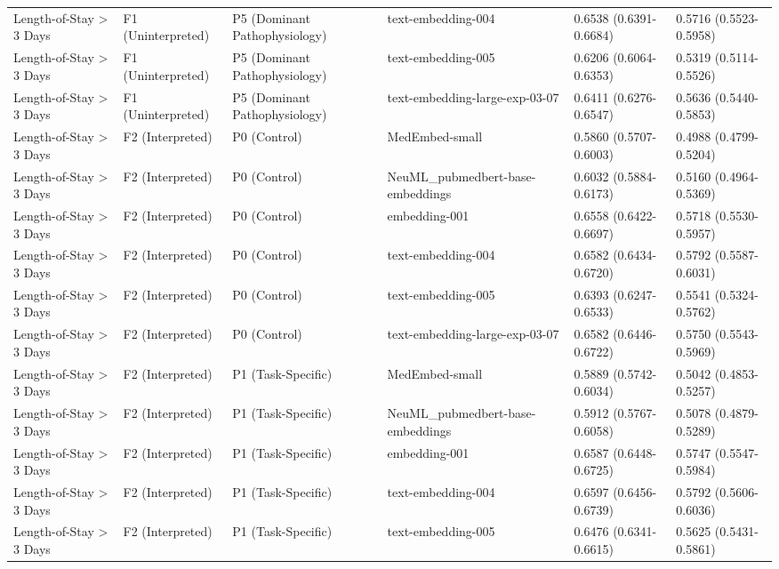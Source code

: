 \begin{tabular}{llllll}
Length-of-Stay \textgreater{} 3 Days & F1 (Uninterpreted) & P5 (Dominant Pathophysiology) & text-embedding-004 & 0.6538 (0.6391-0.6684) & 0.5716 (0.5523-0.5958) \\
Length-of-Stay \textgreater{} 3 Days & F1 (Uninterpreted) & P5 (Dominant Pathophysiology) & text-embedding-005 & 0.6206 (0.6064-0.6353) & 0.5319 (0.5114-0.5526) \\
Length-of-Stay \textgreater{} 3 Days & F1 (Uninterpreted) & P5 (Dominant Pathophysiology) & text-embedding-large-exp-03-07 & 0.6411 (0.6276-0.6547) & 0.5636 (0.5440-0.5853) \\
Length-of-Stay \textgreater{} 3 Days & F2 (Interpreted) & P0 (Control) & MedEmbed-small & 0.5860 (0.5707-0.6003) & 0.4988 (0.4799-0.5204) \\
Length-of-Stay \textgreater{} 3 Days & F2 (Interpreted) & P0 (Control) & NeuML\_pubmedbert-base-embeddings & 0.6032 (0.5884-0.6173) & 0.5160 (0.4964-0.5369) \\
Length-of-Stay \textgreater{} 3 Days & F2 (Interpreted) & P0 (Control) & embedding-001 & 0.6558 (0.6422-0.6697) & 0.5718 (0.5530-0.5957) \\
Length-of-Stay \textgreater{} 3 Days & F2 (Interpreted) & P0 (Control) & text-embedding-004 & 0.6582 (0.6434-0.6720) & 0.5792 (0.5587-0.6031) \\
Length-of-Stay \textgreater{} 3 Days & F2 (Interpreted) & P0 (Control) & text-embedding-005 & 0.6393 (0.6247-0.6533) & 0.5541 (0.5324-0.5762) \\
Length-of-Stay \textgreater{} 3 Days & F2 (Interpreted) & P0 (Control) & text-embedding-large-exp-03-07 & 0.6582 (0.6446-0.6722) & 0.5750 (0.5543-0.5969) \\
Length-of-Stay \textgreater{} 3 Days & F2 (Interpreted) & P1 (Task-Specific) & MedEmbed-small & 0.5889 (0.5742-0.6034) & 0.5042 (0.4853-0.5257) \\
Length-of-Stay \textgreater{} 3 Days & F2 (Interpreted) & P1 (Task-Specific) & NeuML\_pubmedbert-base-embeddings & 0.5912 (0.5767-0.6058) & 0.5078 (0.4879-0.5289) \\
Length-of-Stay \textgreater{} 3 Days & F2 (Interpreted) & P1 (Task-Specific) & embedding-001 & 0.6587 (0.6448-0.6725) & 0.5747 (0.5547-0.5984) \\
Length-of-Stay \textgreater{} 3 Days & F2 (Interpreted) & P1 (Task-Specific) & text-embedding-004 & 0.6597 (0.6456-0.6739) & 0.5792 (0.5606-0.6036) \\
Length-of-Stay \textgreater{} 3 Days & F2 (Interpreted) & P1 (Task-Specific) & text-embedding-005 & 0.6476 (0.6341-0.6615) & 0.5625 (0.5431-0.5861) \\

\end{tabular}
